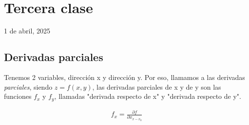 \section{Tercera clase}

1 de abril, 2025

\subsection{Derivadas parciales}

Tenemos 2 variables,
dirección x y dirección y.
Por eso,
llamamos a las derivadas \textit{parciales},
siendo \(z = f(x,y)\),
las derivadas parciales de x y de y son las funciones \(f_x\) y \(f_y\),
llamadas "derivada respecto de x"
y "derivada respecto de y".

\begin{align*}
    f_x = \frac{\partial f}{\partial x_{x-x_0}}
\end{align*}